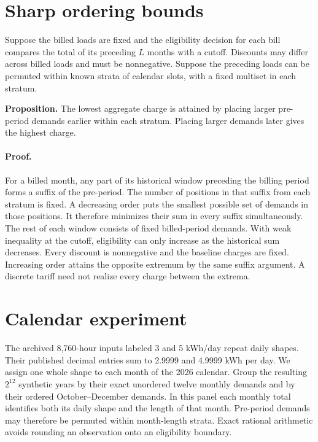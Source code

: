\documentclass[11pt]{article}
\begin{document}
\section{Sharp ordering bounds}
Suppose the billed loads are fixed and the eligibility decision for each bill compares the total of its preceding $L$ months with a cutoff. Discounts may differ across billed loads and must be nonnegative. Suppose the preceding loads can be permuted within known strata of calendar slots, with a fixed multiset in each stratum.

\textbf{Proposition.} The lowest aggregate charge is attained by placing larger pre-period demands earlier within each stratum. Placing larger demands later gives the highest charge.

\paragraph{Proof.} For a billed month, any part of its historical window preceding the billing period forms a suffix of the pre-period. The number of positions in that suffix from each stratum is fixed. A decreasing order puts the smallest possible set of demands in those positions. It therefore minimizes their sum in every suffix simultaneously. The rest of each window consists of fixed billed-period demands. With weak inequality at the cutoff, eligibility can only increase as the historical sum decreases. Every discount is nonnegative and the baseline charges are fixed. Increasing order attains the opposite extremum by the same suffix argument. A discrete tariff need not realize every charge between the extrema.

\section{Calendar experiment}
The archived 8,760-hour inputs labeled 3 and 5 kWh/day repeat daily shapes. Their published decimal entries sum to 2.9999 and 4.9999 kWh per day. We assign one whole shape to each month of the 2026 calendar. Group the resulting $2^{12}$ synthetic years by their exact unordered twelve monthly demands and by their ordered October--December demands. In this panel each monthly total identifies both its daily shape and the length of that month. Pre-period demands may therefore be permuted within month-length strata. Exact rational arithmetic avoids rounding an observation onto an eligibility boundary.
\end{document}
